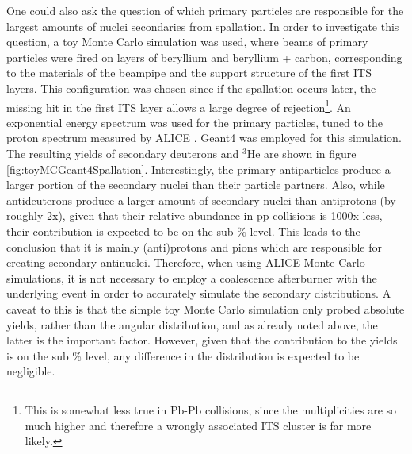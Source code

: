 

One could also ask the question of which primary particles are responsible for the largest amounts of nuclei secondaries from spallation. In order to investigate this question, a toy Monte Carlo simulation was used, where beams of primary particles were fired on layers of beryllium and beryllium + carbon, corresponding to the materials of the beampipe and the support structure of the first ITS layers. This configuration was chosen since if the spallation occurs later, the missing hit in the first ITS layer allows a large degree of rejection\footnote{This is somewhat less true in Pb-Pb collisions, since the multiplicities are so much higher and therefore a wrongly associated ITS cluster is far more likely.}. An exponential energy spectrum was used for the primary particles, tuned to the proton spectrum measured by ALICE \cite{}. Geant4 was employed for this simulation. The resulting yields of secondary deuterons and $^3\mathrm{He}$ are shown in figure \ref{fig:toyMCGeant4Spallation}. Interestingly, the primary antiparticles produce a larger portion of the secondary nuclei than their particle partners. Also, while antideuterons produce a larger amount of secondary nuclei than antiprotons (by roughly 2x), given that their relative abundance in pp collisions is 1000x less, their contribution is expected to be on the sub \% level. This leads to the conclusion that it is mainly (anti)protons and pions which are responsible for creating secondary antinuclei. Therefore, when using ALICE Monte Carlo simulations, it is not necessary to employ a coalescence afterburner with the underlying event in order to accurately simulate the secondary distributions. A caveat to this is that the simple toy Monte Carlo simulation only probed absolute yields, rather than the angular distribution, and as already noted above, the latter is the important factor. However, given that the contribution to the yields is on the sub \% level, any difference in the distribution is expected to be negligible. 

